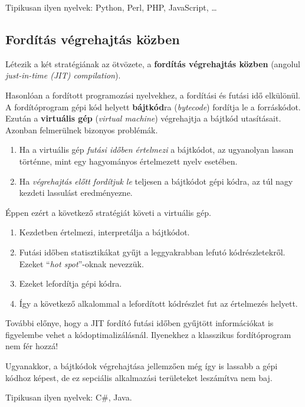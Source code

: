 Tipikusan ilyen nyelvek: Python, Perl, PHP, JavaScript, \dots

\subsection{Fordítás végrehajtás közben}

Létezik a két stratégiának az ötvözete, a \textbf{fordítás végrehajtás közben} (angolul \textit{just-in-time (JIT) compilation}).

Hasonlóan a fordított programozási nyelvekhez, a fordítási és futási idő elkülönül. A fordítóprogram gépi kód helyett \textbf{bájtkód}ra (\textit{bytecode}) fordítja le a forráskódot. Ezután a \textbf{virtuális gép} (\textit{virtual machine}) végrehajtja a bájtkód utasításait. Azonban felmerülnek bizonyos problémák.
\begin{enumerate}
	\item Ha a virtuális gép \textit{futási időben értelmezi} a bájtkódot, az ugyanolyan lassan történne, mint egy hagyományos értelmezett nyelv esetében.
	\item Ha \textit{végrehajtás előtt fordítjuk le} teljesen a bájtkódot gépi kódra, az túl nagy kezdeti lassulást eredményezne.
\end{enumerate}

Éppen ezért a következő stratégiát követi a virtuális gép.
\begin{enumerate}
	\item Kezdetben értelmezi, interpretálja a bájtkódot.
	\item Futási időben statisztikákat gyűjt a leggyakrabban lefutó kódrészletekről. Ezeket ``\textit{hot spot}''-oknak nevezzük.
	\item Ezeket lefordítja gépi kódra.
	\item Így a következő alkalommal a lefordított kódrészlet fut az értelmezés helyett.
\end{enumerate}

További előnye, hogy a JIT fordító futási időben gyűjtött információkat is figyelembe vehet a kódoptimalizálásnál. Ilyenekhez a klasszikus fordítóprogram nem fér hozzá!

Ugyanakkor, a bájtkódok végrehajtása jellemzően még így is lassabb a gépi kódhoz képest, de ez sepciális alkalmazási
területeket leszámítva nem baj.

Tipikusan ilyen nyelvek: C\#, Java.

